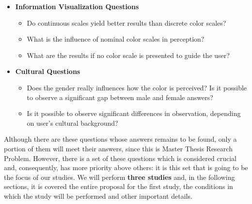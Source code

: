 \documentclass{report}
\begin{document}
\begin{itemize}
    \newpage
    \item \textbf{Information Visualization Questions}
    \begin{itemize}
    	\setlength\itemsep{0.1em}
		\item Do continuous scales yield better results than discrete color scales?
        \item What is the influence of nominal color scales in perception?
        \item What are the results if no color scale is presented to guide the user? 
	\end{itemize}
    \item \textbf{Cultural Questions}
    \begin{itemize}
    	\setlength\itemsep{0.1em}
		\item Does the gender really influences how the color is perceived? Is it possible to observe a significant gap between male and female answers?
\item Is it possible to observe significant differences in observation, depending on user's cultural background?  
	\end{itemize}
\end{itemize} \par
%
Although there are these questions whose answers remains to be found, only a portion of them will meet their answers, since this is Master Thesis Research Problem. However, there is a set of these questions which is considered crucial and, consequently, has more priority above others: it is this set that is going to be the focus of our studies. We will perform \textbf{three studies} and, in the following sections, it is covered the entire proposal for the first study, the conditions in which the study will be performed and other important details.
%
\end{document}
